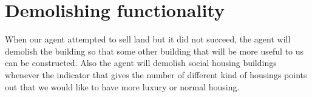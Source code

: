 \section{Demolishing functionality}
When our agent attempted to sell land but it did not succeed, the agent will demolish the building so that some other building that will be more useful to us can be constructed. Also the agent will demolish social housing buildings whenever the indicator that gives the number of different kind of housings points out that we would like to have more luxury or normal housing. 
